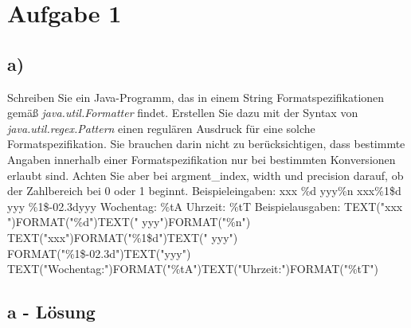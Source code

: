 \section*{Aufgabe 1}
\subsection*{a)}
Schreiben Sie ein Java-Programm, das in einem String Formatspezifikationen gemäß
\textit{java.util.Formatter}
findet. \newline
Erstellen Sie dazu mit der Syntax von
\textit{java.util.regex.Pattern}
einen regulären Ausdruck für eine solche Formatspezifikation. \newline
Sie brauchen darin nicht zu berücksichtigen, dass bestimmte Angaben innerhalb einer Formatspezifikation
nur bei bestimmten Konversionen erlaubt sind.
Achten Sie aber bei argment\_index, width und precision darauf, ob der Zahlbereich bei 0 oder 1 beginnt. \newline
\newline
Beispieleingaben: \newline
xxx \%d yyy\%n \newline
xxx\%1\$d yyy \newline
\%1\$-02.3dyyy \newline
Wochentag: \%tA Uhrzeit: \%tT \newline
\newline
Beispielausgaben: \newline
TEXT("xxx ")FORMAT("\%d")TEXT(" yyy")FORMAT("\%n") \newline
TEXT("xxx")FORMAT("\%1\$d")TEXT(" yyy") \newline
FORMAT("\%1\$-02.3d")TEXT("yyy") \newline
TEXT("Wochentag:")FORMAT("\%tA")TEXT("Uhrzeit:")FORMAT("\%tT") \newline
\newline

\newpage
\subsection*{a - Lösung}

